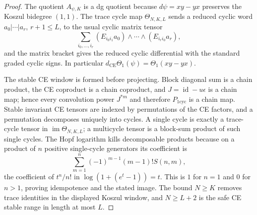 \documentclass[11pt]{memoir}
\begin{document}
\begin{proof}
  The quotient \(A_{\psi,K}\) is a dg quotient because
  \(d\psi=xy-yx\) preserves the Koszul bidegree \((1,1)\).  The trace
  cycle map \(\Theta_{N,K,L}\) sends a reduced cyclic word
  \(a_0|\cdots|a_r\), \(r+1\leq L\), to the usual cyclic matrix tensor
  \[
    \sum_{i_0,\ldots,i_r}
    (E_{i_0i_1}a_0)\wedge\cdots\wedge(E_{i_ri_0}a_r),
  \]
  and the matrix bracket gives the reduced cyclic differential with the
  standard graded cyclic signs.  In particular
  \(d_{\mathrm{CE}}\Theta_1(\psi)=\Theta_1(xy-yx)\).

  The stable CE window is formed before projecting.  Block diagonal sum
  is a chain product, the CE coproduct is a chain coproduct, and
  \(J=\operatorname{id}-u\epsilon\) is a chain map; hence every
  convolution power \(J^{*m}\) and therefore \(P_{1\mathrm{cyc}}\) is a
  chain map.  Stable invariant CE tensors are indexed by permutations of
  the CE factors, and a permutation decomposes uniquely into cycles.  A
  single cycle is exactly a trace-cycle tensor in
  \(\operatorname{im}\Theta_{N,K,L}\); a multicycle tensor is a block-sum
  product of such single cycles.  The Hopf logarithm kills decomposable
  products because on a product of \(n\) positive single-cycle generators
  its coefficient is
  \[
    \sum_{m=1}^{n}(-1)^{m-1}(m-1)!S(n,m),
  \]
  the coefficient of \(t^n/n!\) in \(\log(1+(e^t-1))=t\).  This is \(1\)
  for \(n=1\) and \(0\) for \(n>1\), proving idempotence and the stated
  image.  The bound \(N\geq K\) removes trace identities in the displayed
  Koszul window, and \(N\geq L+2\) is the safe CE stable range in length
  at most \(L\).
\end{proof}
\end{document}
